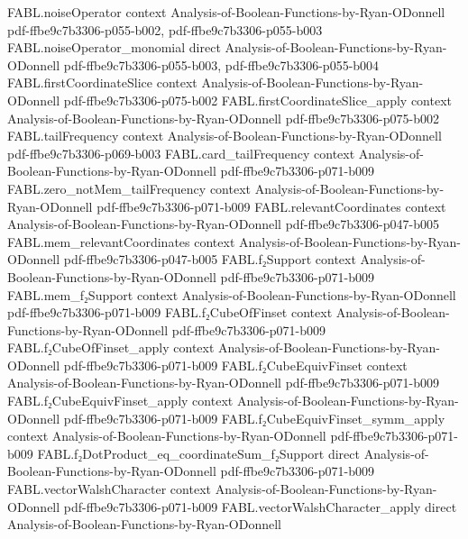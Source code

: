 \begin{theorem}
\proofstep
  {FABL.noiseOperator}
  {context}
  {Analysis-of-Boolean-Functions-by-Ryan-ODonnell}
  {pdf-ffbe9c7b3306-p055-b002,
    pdf-ffbe9c7b3306-p055-b003}
\proofstep
  {FABL.noiseOperator_monomial}
  {direct}
  {Analysis-of-Boolean-Functions-by-Ryan-ODonnell}
  {pdf-ffbe9c7b3306-p055-b003,
    pdf-ffbe9c7b3306-p055-b004}
\proofstep
  {FABL.firstCoordinateSlice}
  {context}
  {Analysis-of-Boolean-Functions-by-Ryan-ODonnell}
  {pdf-ffbe9c7b3306-p075-b002}
\proofstep
  {FABL.firstCoordinateSlice_apply}
  {context}
  {Analysis-of-Boolean-Functions-by-Ryan-ODonnell}
  {pdf-ffbe9c7b3306-p075-b002}
\proofstep
  {FABL.tailFrequency}
  {context}
  {Analysis-of-Boolean-Functions-by-Ryan-ODonnell}
  {pdf-ffbe9c7b3306-p069-b003}
\proofstep
  {FABL.card_tailFrequency}
  {context}
  {Analysis-of-Boolean-Functions-by-Ryan-ODonnell}
  {pdf-ffbe9c7b3306-p071-b009}
\proofstep
  {FABL.zero_notMem_tailFrequency}
  {context}
  {Analysis-of-Boolean-Functions-by-Ryan-ODonnell}
  {pdf-ffbe9c7b3306-p071-b009}
\proofstep
  {FABL.relevantCoordinates}
  {context}
  {Analysis-of-Boolean-Functions-by-Ryan-ODonnell}
  {pdf-ffbe9c7b3306-p047-b005}
\proofstep
  {FABL.mem_relevantCoordinates}
  {context}
  {Analysis-of-Boolean-Functions-by-Ryan-ODonnell}
  {pdf-ffbe9c7b3306-p047-b005}
\proofstep
  {FABL.f₂Support}
  {context}
  {Analysis-of-Boolean-Functions-by-Ryan-ODonnell}
  {pdf-ffbe9c7b3306-p071-b009}
\proofstep
  {FABL.mem_f₂Support}
  {context}
  {Analysis-of-Boolean-Functions-by-Ryan-ODonnell}
  {pdf-ffbe9c7b3306-p071-b009}
\proofstep
  {FABL.f₂CubeOfFinset}
  {context}
  {Analysis-of-Boolean-Functions-by-Ryan-ODonnell}
  {pdf-ffbe9c7b3306-p071-b009}
\proofstep
  {FABL.f₂CubeOfFinset_apply}
  {context}
  {Analysis-of-Boolean-Functions-by-Ryan-ODonnell}
  {pdf-ffbe9c7b3306-p071-b009}
\proofstep
  {FABL.f₂CubeEquivFinset}
  {context}
  {Analysis-of-Boolean-Functions-by-Ryan-ODonnell}
  {pdf-ffbe9c7b3306-p071-b009}
\proofstep
  {FABL.f₂CubeEquivFinset_apply}
  {context}
  {Analysis-of-Boolean-Functions-by-Ryan-ODonnell}
  {pdf-ffbe9c7b3306-p071-b009}
\proofstep
  {FABL.f₂CubeEquivFinset_symm_apply}
  {context}
  {Analysis-of-Boolean-Functions-by-Ryan-ODonnell}
  {pdf-ffbe9c7b3306-p071-b009}
\proofstep
  {FABL.f₂DotProduct_eq_coordinateSum_f₂Support}
  {direct}
  {Analysis-of-Boolean-Functions-by-Ryan-ODonnell}
  {pdf-ffbe9c7b3306-p071-b009}
\proofstep
  {FABL.vectorWalshCharacter}
  {context}
  {Analysis-of-Boolean-Functions-by-Ryan-ODonnell}
  {pdf-ffbe9c7b3306-p071-b009}
\proofstep
  {FABL.vectorWalshCharacter_apply}
  {direct}
  {Analysis-of-Boolean-Functions-by-Ryan-ODonnell}

\end{theorem}
